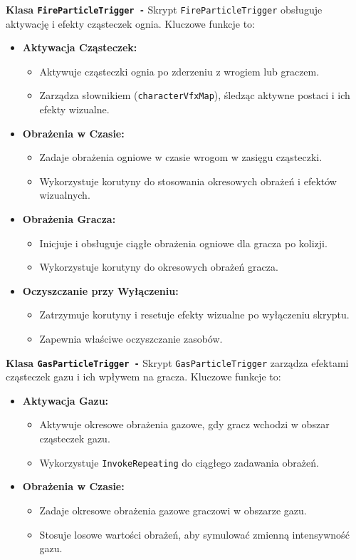 \textbf{Klasa \texttt{FireParticleTrigger -}}
Skrypt \texttt{FireParticleTrigger} obsługuje aktywację i efekty cząsteczek ognia. Kluczowe funkcje to:
\begin{itemize}
\item \textbf{Aktywacja Cząsteczek:}
    \begin{itemize}
         \item Aktywuje cząsteczki ognia po zderzeniu z wrogiem lub graczem.
         \item Zarządza słownikiem (\texttt{characterVfxMap}), śledząc aktywne postaci i ich efekty wizualne.
    \end{itemize}
\item \textbf{Obrażenia w Czasie:}
    \begin{itemize}
         \item Zadaje obrażenia ogniowe w czasie wrogom w zasięgu cząsteczki.
         \item Wykorzystuje korutyny do stosowania okresowych obrażeń i efektów wizualnych.
    \end{itemize}
\item \textbf{Obrażenia Gracza:}
    \begin{itemize}
         \item Inicjuje i obsługuje ciągłe obrażenia ogniowe dla gracza po kolizji.
         \item Wykorzystuje korutyny do okresowych obrażeń gracza.
    \end{itemize}
\item \textbf{Oczyszczanie przy Wyłączeniu:}
    \begin{itemize}
        \item Zatrzymuje korutyny i resetuje efekty wizualne po wyłączeniu skryptu.
        \item Zapewnia właściwe oczyszczanie zasobów.
    \end{itemize}
\end{itemize}

\textbf{Klasa \texttt{GasParticleTrigger -}}
Skrypt \texttt{GasParticleTrigger} zarządza efektami cząsteczek gazu i ich wpływem na gracza. Kluczowe funkcje to:
\begin{itemize}
\item \textbf{Aktywacja Gazu:}
    \begin{itemize}
        \item Aktywuje okresowe obrażenia gazowe, gdy gracz wchodzi w obszar cząsteczek gazu.
        \item Wykorzystuje \texttt{InvokeRepeating} do ciągłego zadawania obrażeń.
    \end{itemize}
\item \textbf{Obrażenia w Czasie:}
    \begin{itemize}
        \item Zadaje okresowe obrażenia gazowe graczowi w obszarze gazu.
        \item Stosuje losowe wartości obrażeń, aby symulować zmienną intensywność gazu.
    \end{itemize}
\end{itemize}

